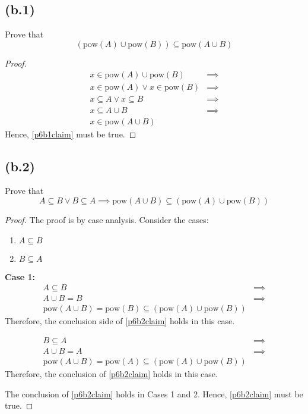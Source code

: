 \documentclass{article}
\begin{document}
\subsection{(b.1)}
Prove that
\begin{equation}\label{p6b1claim}
	(\text{pow}(A) \cup \text{pow}(B)) \subseteq \text{pow}(A \cup B)
\end{equation}
\begin{proof}
	\begin{align*}
		x \in \text{pow}(A) \cup \text{pow}(B)       & \implies \\
		x \in \text{pow}(A) \lor x \in \text{pow}(B) & \implies \\
		x \subseteq A \lor x \subseteq B             & \implies \\
		x \subseteq A \cup B                         & \implies \\
		x \in \text{pow}(A \cup B)
	\end{align*}
	Hence, \eqref{p6b1claim} must be true.
\end{proof}

\subsection{(b.2)}
Prove that
\begin{equation}\label{p6b2claim}
	A \subseteq B \lor B \subseteq A \implies \text{pow}(A \cup B) \subseteq (\text{pow}(A) \cup \text{pow}(B))
\end{equation}
\begin{proof}
	The proof is by case analysis. Consider the cases:
	\begin{enumerate}
		\item $A \subseteq B$
		\item $B \subseteq A$
	\end{enumerate}

	\textbf{Case 1:}
	\begin{align*}
		A \subseteq B & \implies \\
		A \cup B = B  & \implies \\
		\text{pow}(A \cup B) = \text{pow}(B) \subseteq (\text{pow}(A) \cup \text{pow}(B))
	\end{align*}
	Therefore, the conclusion side of \eqref{p6b2claim} holds in this case.

	\begin{align*}
		B \subseteq A & \implies \\
		A \cup B = A  & \implies \\
		\text{pow}(A \cup B) = \text{pow}(A) \subseteq (\text{pow}(A) \cup \text{pow}(B))
	\end{align*}
	Therefore, the conclusion of \eqref{p6b2claim} holds in this case.

	The conclusion of \eqref{p6b2claim} holds in Cases 1 and 2. Hence, \eqref{p6b2claim} must be true.
\end{proof}
\end{document}
